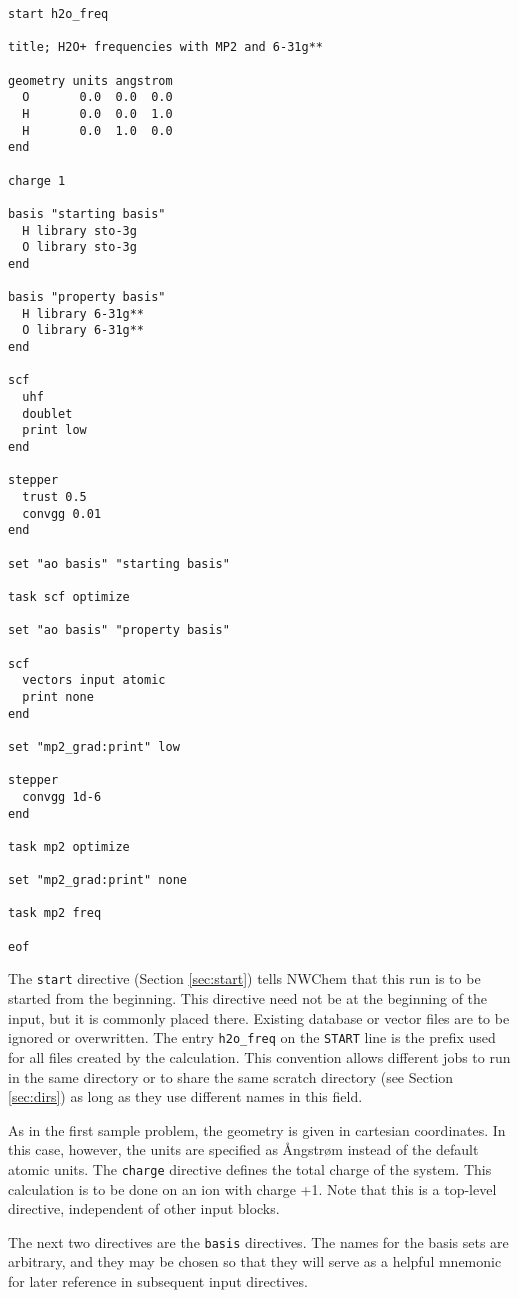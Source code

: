 \begin{verbatim}
start h2o_freq

title; H2O+ frequencies with MP2 and 6-31g**

geometry units angstrom
  O       0.0  0.0  0.0
  H       0.0  0.0  1.0
  H       0.0  1.0  0.0
end

charge 1

basis "starting basis"
  H library sto-3g
  O library sto-3g
end

basis "property basis"
  H library 6-31g**
  O library 6-31g**
end

scf
  uhf
  doublet
  print low
end

stepper
  trust 0.5
  convgg 0.01
end

set "ao basis" "starting basis"

task scf optimize

set "ao basis" "property basis"

scf
  vectors input atomic
  print none
end

set "mp2_grad:print" low

stepper
  convgg 1d-6
end

task mp2 optimize

set "mp2_grad:print" none

task mp2 freq

eof
\end{verbatim}

The {\tt start} directive (Section \ref{sec:start}) tells NWChem that
this run is to be started from the beginning.  This directive need not
be at the beginning of the input, but it is commonly placed there.
Existing database or vector files are to be ignored or overwritten.
The entry \verb+h2o_freq+ on the \verb+START+ line is the prefix used
for all files created by the calculation.  This convention allows
different jobs to run in the same directory or to share the same
scratch directory (see Section \ref{sec:dirs}) as long as they use
different names in this field.

As in the first sample problem, the geometry is given in cartesian
coordinates.  In this case, however, the units are specified as
{\AA}ngstr{\o}m instead of the default atomic units.  The {\tt charge}
directive defines the total charge of the system.  This calculation is
to be done on an ion with charge +1.  Note that this is a top-level
directive, independent of other input blocks.

The next two directives are the {\tt basis} directives.  The names for
the basis sets are arbitrary, and they may be chosen so that they will
serve as a helpful mnemonic for later reference in subsequent input
directives.

